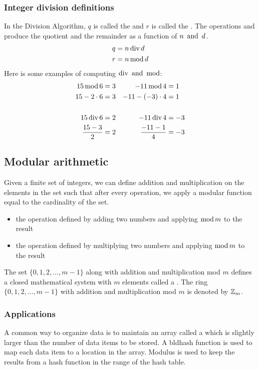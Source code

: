 \subsubsection*{Integer division definitions}
In the Division Algorithm, $q$ is called the  and $r$ is called the . The operations \bld{$\tdiv$} and \bld{$\tmod$} produce the quotient and the remainder as a function of $n \operatorname{~\text{and}~} d$.
\begin{align*}
    q & = n \operatorname{\text{div}} d \\
    r & = n \operatorname{\text{mod}} d
\end{align*}
Here is some examples of computing $\operatorname{\text{div}} \operatorname{~\text{and}~} \operatorname{\text{mod}}$:
\begin{align*}
    15 \operatorname{\text{mod}} 6       & = 3 & -11 \operatorname{\text{mod}} 4        & = 1  \\
    15 - 2 \cdot 6   & = 3 & -11 - (-3) \cdot 4 & = 1  \\ \\
    15 \operatorname{\text{div}} 6       & = 2 & -11 \operatorname{\text{div}} 4        & = -3 \\
    \frac{15 - 3}{2} & = 2 & \frac{-11 - 1}{4}  & = -3
\end{align*}

\subsection{Modular arithmetic}
Given a finite set of integers, we can define addition and multiplication on the elements in the set such that after every operation, we apply a modular function equal to the cardinality of the set.
\begin{itemize}
    \item {}
          \subitem the operation defined by adding two numbers and applying $\operatorname{\text{mod}} m$ to the result
    \item {}
          \subitem the operation defined by multiplying two numbers and applying $\operatorname{\text{mod}} m$ to the result
\end{itemize}
The set $\{0,1,2,\ldots,m-1\}$ along with addition and multiplication mod $m$ defines a closed mathematical system with $m$ elements called a . The ring $\{0,1,2,\ldots,m-1\}$ with addition and multiplication mod $m$ is denoted by $\mathbb{Z}_m$.

\subsubsection*{Applications}
A common way to organize data is to maintain an array called a  which is slightly larger than the number of data items to be stored. A bld{hash function} is used to map each data item to a location in the array. Modulus is used to keep the results from a hash function in the range of the hash table.

